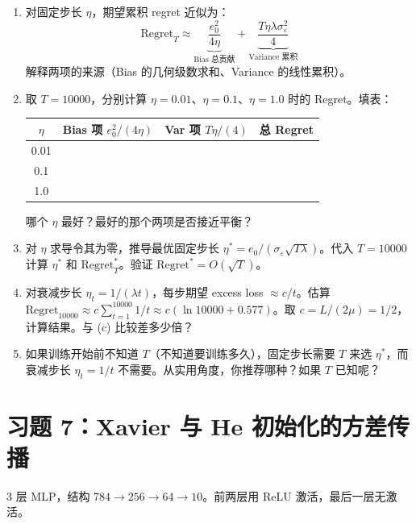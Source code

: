 \documentclass[12pt, a4paper]{ctexart}
\begin{document}
\begin{enumerate}
    \item[(a)] 对固定步长 $\eta$，期望累积 regret 近似为：
    \[
    \text{Regret}_T \approx \underbrace{\frac{e_0^2}{4\eta}}_{\text{Bias 总贡献}} + \underbrace{\frac{T\eta\lambda\sigma_\varepsilon^2}{4}}_{\text{Variance 累积}}
    \]
    解释两项的来源（Bias 的几何级数求和、Variance 的线性累积）。
    
    \item[(b)] 取 $T = 10000$，分别计算 $\eta = 0.01$、$\eta = 0.1$、$\eta = 1.0$ 时的 Regret。填表：
    \begin{center}
    \begin{tabular}{c|ccc}
    $\eta$ & Bias 项 $e_0^2/(4\eta)$ & Var 项 $T\eta/(4)$ & 总 Regret \\
    \hline
    0.01 & & & \\
    0.1 & & & \\
    1.0 & & & \\
    \end{tabular}
    \end{center}
    哪个 $\eta$ 最好？最好的那个两项是否接近平衡？
    
    \item[(c)] 对 $\eta$ 求导令其为零，推导最优固定步长 $\eta^* = e_0/(\sigma_\varepsilon\sqrt{T\lambda})$。代入 $T = 10000$ 计算 $\eta^*$ 和 $\text{Regret}_T^*$。验证 $\text{Regret}^* = O(\sqrt{T})$。
    
    \item[(d)] 对衰减步长 $\eta_t = 1/(\lambda t)$，每步期望 excess loss $\approx c/t$。估算 $\text{Regret}_{10000} \approx c \sum_{t=1}^{10000} 1/t \approx c(\ln 10000 + 0.577)$。取 $c = L/(2\mu) = 1/2$，计算结果。与 (c) 比较差多少倍？
    
    \item[(e)] 如果训练开始前不知道 $T$（不知道要训练多久），固定步长需要 $T$ 来选 $\eta^*$，而衰减步长 $\eta_t = 1/t$ 不需要。从实用角度，你推荐哪种？如果 $T$ 已知呢？
\end{enumerate}




\section*{习题 7：Xavier 与 He 初始化的方差传播}

3 层 MLP，结构 $784 \to 256 \to 64 \to 10$。前两层用 ReLU 激活，最后一层无激活。
\end{document}
